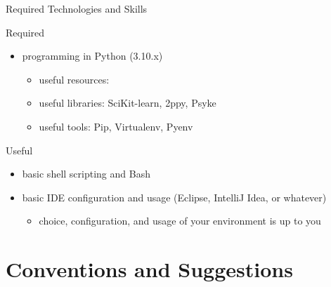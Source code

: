 \documentclass[presentation]{beamer}\mode<presentation>{\usetheme{AMSBolognaFC}}
\begin{document}
\begin{frame}[c,allowframebreaks]{Required Technologies and Skills}
\begin{alertblock}{Required}
\begin{itemize}
		\item[$\checkmark$] programming in Python (3.10.x)
		\begin{itemize}
			\item useful resources: 
			\item useful libraries: SciKit-learn, 2ppy, Psyke
			\item useful tools: Pip, Virtualenv, Pyenv
		\end{itemize}
	\end{itemize}
\end{alertblock}

\begin{exampleblock}{Useful}
	\begin{itemize}
		\item[$\checkmark$] basic shell scripting and \alert{Bash}
		\item[$\checkmark$] basic IDE configuration and usage (\alert{Eclipse}, \alert{IntelliJ Idea}, or whatever)
		\begin{itemize}
			\item choice, configuration, and usage of your environment is up to you
		\end{itemize}
	\end{itemize}
\end{exampleblock}

\end{frame}

\section{Conventions and Suggestions}
\end{document}
